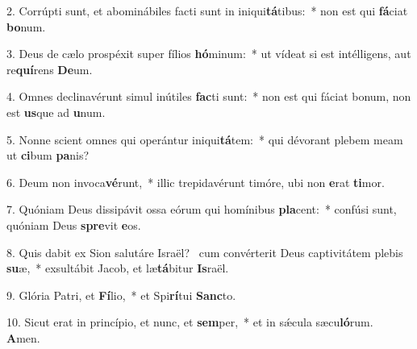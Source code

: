 2. Corrúpti sunt, et abominábiles facti sunt in iniqui\textbf{tá}tibus:~*  non est qui \textbf{fá}ciat \textbf{bo}num.\

3. Deus de cælo prospéxit super fílios \textbf{hó}minum:~*  ut vídeat si est intélligens, aut re\textbf{quí}rens \textbf{De}um.\

4. Omnes declinavérunt simul inútiles \textbf{fac}ti sunt:~*  non est qui fáciat bonum, non est \textbf{us}que ad \textbf{u}num.\

5. Nonne scient omnes qui operántur iniqui\textbf{tá}tem:~*  qui dévorant plebem meam ut \textbf{ci}bum \textbf{pa}nis?\

6. Deum non invoca\textbf{vé}runt,~*  illic trepidavérunt timóre, ubi non \textbf{e}rat \textbf{ti}mor.\

7. Quóniam Deus dissipávit ossa eórum qui homínibus \textbf{pla}cent:~*  confúsi sunt, quóniam Deus \textbf{spre}vit \textbf{e}os.\

8. Quis dabit ex Sion salutáre Israël? \dag\  cum convérterit Deus captivitátem plebis \textbf{su}æ,~*  exsultábit Jacob, et læ\textbf{tá}bitur \textbf{Is}raël.\

9. Glória Patri, et \textbf{Fí}lio,~*  et Spi\textbf{rí}tui \textbf{Sanc}to.\

10. Sicut erat in princípio, et nunc, et \textbf{sem}per,~*  et in sǽcula sæcu\textbf{ló}rum. \textbf{A}men.\

